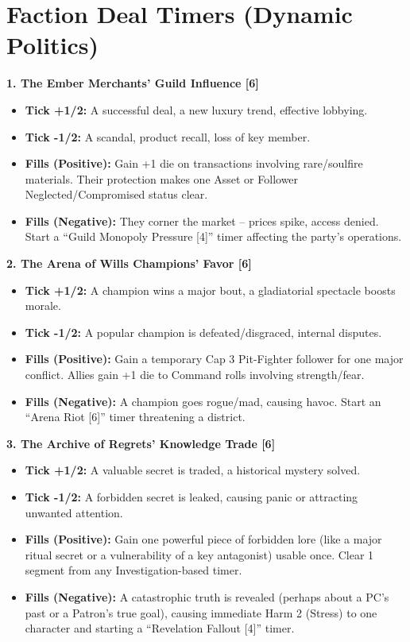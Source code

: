 \documentclass[11pt,letterpaper]{article}
\newcommand{\patronbox}[1]{\noindent\textbf{#1}\\}
\begin{document}
\newpage

\section{Faction Deal Timers (Dynamic Politics)}

\patronbox{1. The Ember Merchants' Guild Influence [6]}
\begin{itemize}[leftmargin=*]
    \item \textbf{Tick +1/2:} A successful deal, a new luxury trend, effective lobbying.
    \item \textbf{Tick -1/2:} A scandal, product recall, loss of key member.
    \item \textbf{Fills (Positive):} Gain +1 die on transactions involving rare/soulfire materials. Their protection makes one Asset or Follower Neglected/Compromised status clear.
    \item \textbf{Fills (Negative):} They corner the market -- prices spike, access denied. Start a ``Guild Monopoly Pressure [4]'' timer affecting the party's operations.
\end{itemize}

\patronbox{2. The Arena of Wills Champions' Favor [6]}
\begin{itemize}[leftmargin=*]
    \item \textbf{Tick +1/2:} A champion wins a major bout, a gladiatorial spectacle boosts morale.
    \item \textbf{Tick -1/2:} A popular champion is defeated/disgraced, internal disputes.
    \item \textbf{Fills (Positive):} Gain a temporary Cap 3 Pit-Fighter follower for one major conflict. Allies gain +1 die to Command rolls involving strength/fear.
    \item \textbf{Fills (Negative):} A champion goes rogue/mad, causing havoc. Start an ``Arena Riot [6]'' timer threatening a district.
\end{itemize}

\patronbox{3. The Archive of Regrets' Knowledge Trade [6]}
\begin{itemize}[leftmargin=*]
    \item \textbf{Tick +1/2:} A valuable secret is traded, a historical mystery solved.
    \item \textbf{Tick -1/2:} A forbidden secret is leaked, causing panic or attracting unwanted attention.
    \item \textbf{Fills (Positive):} Gain one powerful piece of forbidden lore (like a major ritual secret or a vulnerability of a key antagonist) usable once. Clear 1 segment from any Investigation-based timer.
    \item \textbf{Fills (Negative):} A catastrophic truth is revealed (perhaps about a PC's past or a Patron's true goal), causing immediate Harm 2 (Stress) to one character and starting a ``Revelation Fallout [4]'' timer.
\end{itemize}
\end{document}

